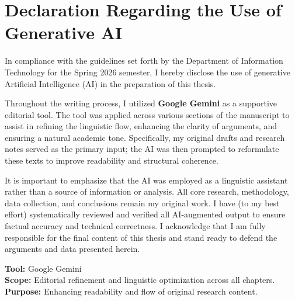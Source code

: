 \section*{Declaration Regarding the Use of Generative AI}

In compliance with the guidelines set forth by the
Department of Information Technology for the Spring 2026 semester,
I hereby disclose the use of generative Artificial Intelligence (AI)
in the preparation of this thesis.

Throughout the writing process, I utilized \textbf{Google Gemini} as a
supportive editorial tool. The tool was applied across various sections
of the manuscript to assist in refining the linguistic flow, enhancing
the clarity of arguments, and ensuring a natural academic tone.
Specifically, my original drafts and research notes served as the primary input;
the AI was then prompted to reformulate these texts to improve readability and
structural coherence.

It is important to emphasize that the AI was employed as a linguistic
assistant rather than a source of information or analysis.
All core research, methodology, data collection, and conclusions remain
my original work. I have (to my best effort) systematically reviewed and verified all
AI-augmented output to ensure factual accuracy and technical correctness.
I acknowledge that I am fully responsible for the final content of this
thesis and stand ready to defend the arguments and data presented herein.

\vspace{1em}
\noindent
\textbf{Tool:} Google Gemini \\
\textbf{Scope:} Editorial refinement and linguistic optimization across all chapters. \\
\textbf{Purpose:} Enhancing readability and flow of original research content.
